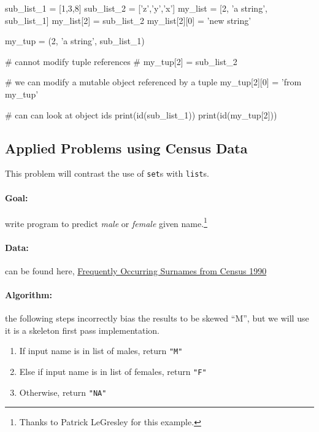 \documentclass[12pt,letterpaper,twoside]{article}
\begin{document}
\begin{python}
sub_list_1 = [1,3,8]
sub_list_2 = ['z','y','x']
my_list = [2, 'a string', sub_list_1]
my_list[2] = sub_list_2
my_list[2][0] = 'new string'

my_tup = (2, 'a string', sub_list_1)

# cannot modify tuple references
# my_tup[2] = sub_list_2

# we can modify a mutable object referenced by a tuple
my_tup[2][0] = 'from my_tup'

# can can look at object ids
print(id(sub_list_1))
print(id(my_tup[2]))
\end{python}


\subsection{Applied Problems using Census Data}
This problem will contrast the use of \texttt{set}s with \texttt{list}s.

\paragraph{Goal:} write program to predict \emph{male} or \emph{female} given name.\footnote{Thanks to Patrick LeGresley for this example.}

\paragraph{Data:} can be found here, 
\href{http://www.census.gov/topics/population/genealogy/data/1990_census/1990_census_namefiles.html}{Frequently Occurring Surnames from Census 1990}

\paragraph{Algorithm:} the following steps incorrectly bias the results to be skewed ``M'', but we will use it is a skeleton first pass implementation.

\begin{enumerate}
\def\labelenumi{\arabic{enumi}.}
\tightlist
\item
  If input name is in list of males, return \texttt{"M"}
\item
  Else if input name is in list of females, return \texttt{"F"}
\item
  Otherwise, return \texttt{"NA"}
\end{enumerate}
\end{document}
